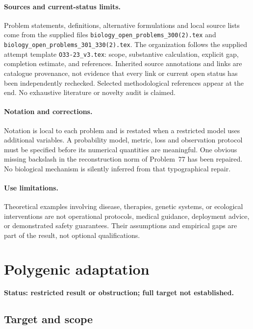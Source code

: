 \documentclass[11pt]{article}
\begin{document}
\paragraph{Sources and current-status limits.}
Problem statements, definitions, alternative formulations and local source lists
come from the supplied files
\texttt{biology\_open\_problems\_300(2).tex} and
\texttt{biology\_open\_problems\_301\_330(2).tex}.
The organization follows the supplied attempt template
\texttt{O33-23\_v3.tex}: scope, substantive calculation, explicit gap,
completion estimate, and references. Inherited source annotations and links are
catalogue provenance, not evidence that every link or current open status has
been independently rechecked. Selected methodological references appear at the
end. No exhaustive literature or novelty audit is claimed.

\paragraph{Notation and corrections.}
Notation is local to each problem and is restated when a restricted model uses
additional variables. A probability model, metric, loss and observation protocol
must be specified before its numerical quantities are meaningful. One obvious
missing backslash in the reconstruction norm of Problem~77 has been repaired.
No biological mechanism is silently inferred from that typographical repair.

\paragraph{Use limitations.}
Theoretical examples involving disease, therapies, genetic systems, or ecological
interventions are not operational protocols, medical guidance, deployment advice,
or demonstrated safety guarantees. Their assumptions and empirical gaps are part
of the result, not optional qualifications.


\section*{Polygenic adaptation}
\label{prob:164}
\noindent\textbf{Status: restricted result or obstruction; full target not established.}
\subsection{Target and scope}
\end{document}
